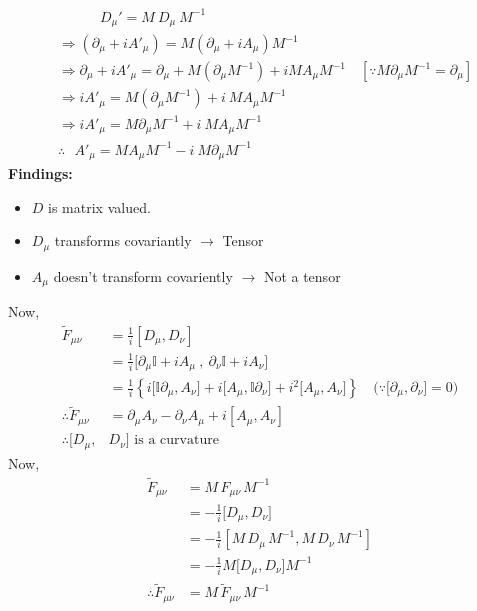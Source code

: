 \documentclass[14pt]{article} %
\begin{document}
\begin{align*}
&\quad \quad \quad D_\mu' = M ~D_\mu ~ M^{-1} \\
&\Rightarrow (\partial_\mu + i A'_\mu) = M (\partial_\mu + i A_\mu) M^{-1} \\
&\Rightarrow \partial_\mu + i A'_\mu = \partial_\mu + M(\partial_\mu M^{-1}) + iM A_\mu M^{-1} \quad [\because M \partial_\mu M^{-1} = \partial_\mu]\\
&\Rightarrow i A'_\mu = M (\partial_\mu M^{-1}) + i~ M A_\mu M^{-1}\\
&\Rightarrow i A'_\mu = M \partial_\mu M^{-1} + i ~M A_\mu M^{-1} \\
&\therefore ~~~ A'_\mu = M A_\mu M^{-1} - i ~M \partial_\mu M^{-1}
\end{align*}
\textbf{Findings:}
\begin{itemize}
\item $D$ is matrix valued.
\item $D_\mu$ transforms covariantly $\to$ Tensor
\item $A_\mu$ doesn't transform covariently $\to$ Not a tensor
\end{itemize}
Now,
\begin{align*}
\tilde{F}_{\mu \nu} &= \frac{1}{i} [D_\mu, D_\nu] \\
&= \frac{1}{i}\big[\partial_\mu \mathbb{I}+ i A_\mu ~,~ \partial_\nu \mathbb{I}+ i A_\nu  \big] \\
&= \frac{1}{i}\left\{ i \big[ \mathbb{I} \partial_\mu , A_\nu \big] + i\big[ A_{\mu}, \mathbb{I} \partial_\nu\big]+i^2 \big[A_\mu , A_\nu \big] \right\} \quad \big( \because \big[ \partial_\mu , \partial_\nu \big] =0 \big)  \\
\therefore\tilde{F}_{\mu\nu} &= \partial_\mu A_\nu - \partial_\nu A_\mu + i[A_\mu, A_\nu] \\
\therefore [D_\mu, &D_\nu] \text{ is a curvature}
\end{align*}
Now,
\begin{align*}
\tilde{F}_{\mu \nu} &= M \,F_{\mu \nu} \, M^{-1} \\
&= -\frac{1}{i} \big[D_\mu, D_\nu \big] \\
&= -\frac{1}{i} \left[ M \,D_\mu \,M^{-1}, M \, D_\nu \, M^{-1} \right] \\
&= -\frac{1}{i} M \big[D_\mu, D_\nu \big] M^{-1} \\
\therefore \tilde{F}_{\mu \nu}&= M \,\tilde{F}_{\mu \nu}\, M^{-1}
\end{align*}
\end{document}
